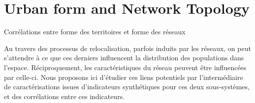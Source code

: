 

\newpage





\section{Urban form and Network Topology}{Corrélations entre forme des territoires et forme des réseaux}




\label{sec:staticcorrelations}





Au travers des processus de relocalisation, parfois induits par les réseaux, on peut s'attendre à ce que ces derniers influencent la distribution des populations dans l'espace. Réciproquement, les caractéristiques du réseau peuvent être influencées par celle-ci. Nous proposons ici d'étudier ces liens potentiels par l'intermédiaire de caractérisations issues d'indicateurs synthétiques pour ces deux sous-systèmes, et des corrélations entre ces indicateurs.


